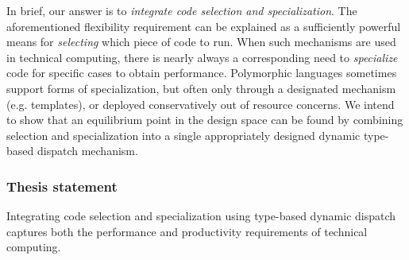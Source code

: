 In brief, our answer is to \emph{integrate code selection and specialization}.
The aforementioned flexibility requirement can be explained as
a sufficiently powerful means for \emph{selecting} which piece of code
to run.
When such mechanisms are used in technical computing, there is nearly
always a corresponding need to \emph{specialize} code for specific cases
to obtain performance.
Polymorphic languages sometimes support forms of specialization,
but often only through a designated mechanism (e.g. templates), or
deployed conservatively out of resource concerns.
We intend to show that an equilibrium point in the design space can be found
by combining selection and specialization into a single appropriately designed
dynamic type-based dispatch mechanism.

\subsubsection{Thesis statement}

Integrating code selection and specialization using
type-based dynamic dispatch captures both the performance and
productivity requirements of technical computing.






